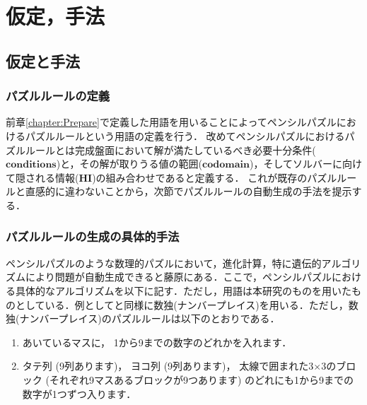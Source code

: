\chapter{仮定，手法}
\label{chapter:3}

\section{仮定と手法}
\subsection{パズルルールの定義}\label{subsection:PuzzleDefinition}
前章\cref{chapter:Prepare}で定義した用語を用いることによってペンシルパズルにおけるパズルルールという用語の定義を行う．
改めてペンシルパズルにおけるパズルルールとは完成盤面において解が満たしているべき必要十分条件($\mathbf{conditions}$)と，その解が取りうる値の範囲($\mathbf{codomain}$)，そしてソルバーに向けて隠される情報($\mathbf{HI}$)の組み合わせであると定義する．
これが既存のパズルルールと直感的に違わないことから，次節でパズルルールの自動生成の手法を提示する．
\subsection{パズルルールの生成の具体的手法}
ペンシルパズルのような数理的パズルにおいて，進化計算，特に遺伝的アルゴリズムにより問題が自動生成できると藤原\cite{Fujiwara2022}にある．ここで，ペンシルパズルにおける具体的なアルゴリズムを以下に記す．ただし，用語は本研究のものを用いたものとしている．例として\cite{Fujiwara2022}と同様に数独(ナンバープレイス)を用いる．ただし，数独(ナンバープレイス)のパズルルールは以下のとおりである．\cite{web:Sudoku}

\begin{enumerate}
  \item あいているマスに， 1から9までの数字のどれかを入れます．
  \item タテ列 (9列あります)， ヨコ列 (9列あります)， 太線で囲まれた3$\times$3のブロック (それぞれ9マスあるブロックが9つあります) のどれにも1から9までの数字が1つずつ入ります．
\end{enumerate}

